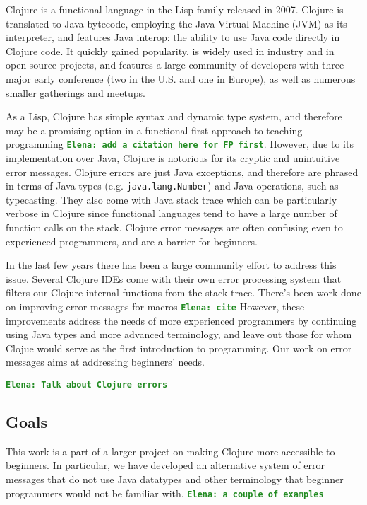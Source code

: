 \documentclass[12pt]{article}
\newcommand{\comment}[1]{{\bf \tt  {#1}}}
\newcommand{\emcomment}[1]{\textcolor{ForestGreen}{\comment{Elena: {#1}}}}
\begin{document}
Clojure is a functional language in the Lisp family released in 2007. 
Clojure is translated to Java bytecode, employing the Java Virtual Machine (JVM) as its interpreter, and features Java interop: the ability to use Java code directly in Clojure code. 
It quickly gained popularity, is widely used in industry and in open-source projects, and features a large community of developers with three major early conference (two in the U.S. and one in Europe), as well as numerous smaller gatherings and meetups. 

As a Lisp, Clojure has simple syntax and dynamic type system, and therefore may be a promising option in a functional-first approach to teaching programming \emcomment{add a citation here for FP first}. However, due to its implementation over Java, Clojure is notorious for its cryptic and unintuitive error messages. Clojure errors are just Java exceptions, and therefore are phrased in terms of Java types (e.g. \texttt{java.lang.Number}) and Java operations, such as typecasting. They also come with Java stack trace which can be particularly verbose in Clojure since functional languages tend to have a large number of function calls on the stack. Clojure error messages are often confusing even to experienced programmers, and are a barrier for beginners. 

In the last few years there has been a large community effort to address this issue. Several Clojure IDEs come with their own error processing system that filters our Clojure internal functions from the stack trace. There's been work done on improving error messages for macros \emcomment{cite} However, these improvements address the needs of more experienced programmers by continuing using Java types and more advanced terminology, and leave out those for whom Clojue would serve as the first introduction to programming. Our work on error messages aims at addressing beginners' needs.  

\emcomment{Talk about Clojure errors}

	\subsection{Goals}\label{sec:goals}
This work is a part of a larger project on making Clojure more accessible to beginners. In particular, we have developed an alternative system of error messages that do not use Java datatypes and other terminology that beginner programmers would not be familiar with. 
\emcomment{a couple of examples}
\end{document}
